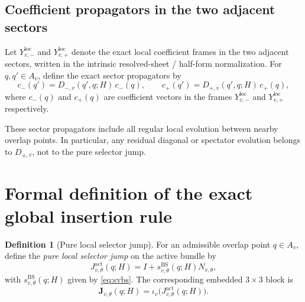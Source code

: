 \documentclass[11pt]{article}
\numberwithin{equation}{section}
\theoremstyle{definition}
\newtheorem{definition}[theorem]{Definition}
\newcommand{\Jact}{J^{\mathrm{act}}_{v,\theta}}
\newcommand{\Jemb}{\mathbf J_{v,\theta}}
\begin{document}
\subsection{Coefficient propagators in the two adjacent sectors}

Let $Y^{\mathrm{loc}}_{v,-}$ and $Y^{\mathrm{loc}}_{v,+}$ denote the exact local coefficient frames in the two adjacent sectors, written in the intrinsic resolved-sheet / half-form normalization. For $q,q'\in A_v$, define the exact sector propagators by
\begin{equation}
\label{eq:Dpm-def}
 c_-(q')=D_{-,v}(q',q;H)\,c_-(q),
 \qquad
 c_+(q')=D_{+,v}(q',q;H)\,c_+(q),
\end{equation}
where $c_-(q)$ and $c_+(q)$ are coefficient vectors in the frames $Y^{\mathrm{loc}}_{v,-}$ and $Y^{\mathrm{loc}}_{v,+}$ respectively.

These sector propagators include all regular local evolution between nearby overlap points. In particular, any residual diagonal or spectator evolution belongs to $D_{\pm,v}$, not to the pure selector jump.

\section{Formal definition of the exact global insertion rule}

\begin{definition}[Pure local selector jump]
\label{def:pure-local-jump}
For an admissible overlap point $q\in A_v$, define the \emph{pure local selector jump} on the active bundle by
\begin{equation}
\label{eq:Jact-def}
\Jact(q;H)=I+s^{\mathrm{BS}}_{v,\theta}(q;H)N_{v,\theta},
\end{equation}
with $s^{\mathrm{BS}}_{v,\theta}(q;H)$ given by \eqref{eq:svbs}. The corresponding embedded $3\times 3$ block is
\begin{equation}
\label{eq:Jemb-def}
\Jemb(q;H)=\iota_v\bigl(\Jact(q;H)\bigr).
\end{equation}
\end{definition}
\end{document}

